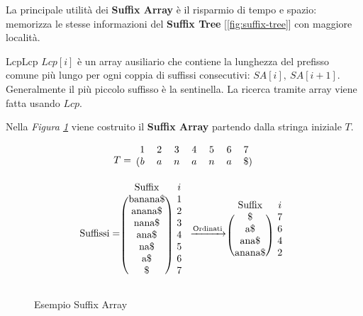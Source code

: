 La principale utilità dei \textbf{Suffix Array} è il risparmio di tempo e spazio: memorizza le stesse informazioni del \textbf{Suffix Tree} [\ref{fig:suffix-tree}] con maggiore località.

\begin{definition}{Lcp}{Lcp}
	$Lcp[i]$ è un array ausiliario che contiene la lunghezza del prefisso comune più lungo per ogni coppia di suffissi consecutivi: $SA[i],\ SA[i+1]$. Generalmente il più piccolo suffisso è la sentinella. La ricerca tramite array viene fatta usando $Lcp$.	
\end{definition}

Nella \textit{Figura \ref{suffix-array-example}} viene costruito il \textbf{Suffix Array} partendo dalla stringa iniziale $T$.
\begin{figure}[H]
	\caption{Esempio Suffix Array \label{suffix-array-example}}
	\begin{gather*}
	T = \begin{blockarray}{ccccccc}
		1 & 2 & 3 & 4 & 5 & 6 & 7 \\
		\begin{block}{(ccccccc)}
			b & a & n & a & n & a & \$ \\
		\end{block}
	\end{blockarray} \\
	\text{Suffissi} = \begin{blockarray}{cc}
		\text{Suffix} & i \\
		\begin{block}{(c)c}
			\text{banana\$} & 1 \\
			\text{anana\$} & 2 \\
			\text{nana\$} & 3 \\
			\text{ana\$} & 4 \\
			\text{na\$} & 5 \\
			\text{a\$} & 6 \\
			\text{\$} & 7 \\
		\end{block}
	\end{blockarray}
	 \xrightarrow{\text{Ordinati}} \begin{blockarray}{cc}
		\text{Suffix} & i \\
		\begin{block}{(c)c}
			\text{\$} & 7 \\
			\text{a\$} & 6 \\
			\text{ana\$} & 4 \\
			\text{anana\$} & 2 \\

\end{block}
\end{blockarray}
\end{gather*}
\end{figure}
